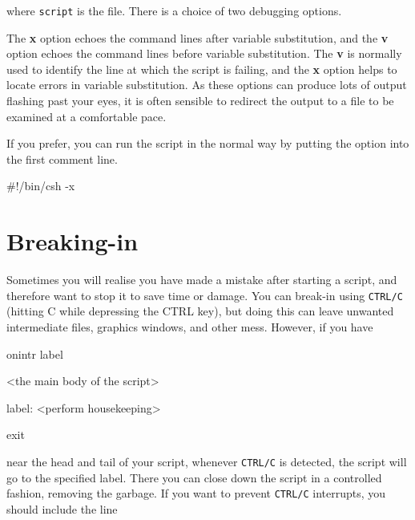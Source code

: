 \documentclass[twoside,11pt,nolof]{starlink}
\begin{document}
\begin{small}
\begin{terminalv}
\end{terminalv}
\end{small}
where \texttt{script} is the file.  There is a choice of two debugging
options.

\begin{small}
\begin{terminalv}
\end{terminalv}
\end{small}
The \textbf{x} option echoes the command lines after variable substitution,
and the \textbf{v} option echoes the command lines before variable
substitution.  The \textbf{v} is normally used to identify the line at
which the script is failing, and the \textbf{x} option helps to locate
errors in variable substitution.  As these options can produce lots of
output flashing past your eyes, it is often sensible to redirect the
output to a file to be examined at a comfortable pace.

If you prefer, you can run the script in the normal way by putting the
option into the first comment line.

\begin{small}
\begin{terminalv}
     #!/bin/csh -x
\end{terminalv}
\end{small}

\section{Breaking-in
\label{sc4_se_break_in}}

Sometimes you will realise you have made a mistake after starting a
script, and therefore want to stop it to save time or damage.  You can
break-in using \texttt{CTRL/C} (hitting C while depressing the CTRL key),
but doing this can leave unwanted intermediate files, graphics
windows, and other mess.  However, if you have

\begin{small}
\begin{terminalv}
     onintr label

     <the main body of the script>

     label:
     <perform housekeeping>

     exit
\end{terminalv}
\end{small}
near the head and tail of your script, whenever \texttt{CTRL/C} is
detected, the script will go to the specified label.  There you can
close down the script in a controlled fashion, removing the garbage.  If
you want to prevent \texttt{CTRL/C} interrupts, you should include the line
\end{document}
